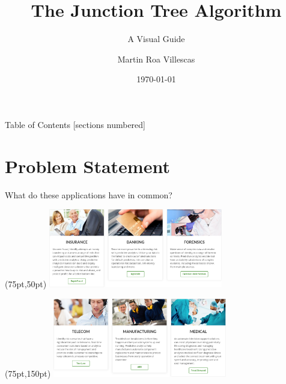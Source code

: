 \documentclass[10pt,usenames,dvipsnames]{beamer}
\title{The Junction Tree Algorithm}
\subtitle{A Visual Guide}
\date{\today}
\author{Martin Roa Villescas}
\institute{Eindhoven University of Technology}
\begin{document}
\maketitle

 \begin{frame}{Table of Contents}
   [sections numbered]
   \tableofcontents[hideallsubsections]
 \end{frame}

\section{Problem Statement}

\begin{frame}{What do these applications have in common?}
  \begin{textblock*}{10pt}(75pt,50pt)
    \includegraphics[width=215pt]{figures/hugin-expert/industry-applications-1.png}
  \end{textblock*}
  \begin{textblock*}{10pt}(75pt,150pt)
    \includegraphics[width=215pt]{figures/hugin-expert/industry-applications-2.png}
  \end{textblock*}
\end{frame}
\end{document}
